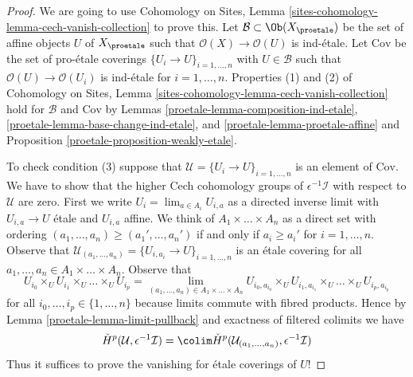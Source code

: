 \begin{proof}

We are going to use
Cohomology on Sites, Lemma \ref{sites-cohomology-lemma-cech-vanish-collection}
to prove this. Let $\mathcal{B} \subset \Ob(X_\proetale)$ be the set of affine
objects $U$ of $X_\proetale$ such that $\mathcal{O}(X) \to \mathcal{O}(U)$ is
ind-\'etale. Let $\text{Cov}$ be the set of pro-\'etale coverings
$\{U_i \to U\}_{i = 1, \ldots, n}$ with $U \in \mathcal{B}$ such that
$\mathcal{O}(U) \to \mathcal{O}(U_i)$ is ind-\'etale for $i = 1, \ldots, n$.
Properties (1) and (2) of
Cohomology on Sites, Lemma \ref{sites-cohomology-lemma-cech-vanish-collection}
hold for $\mathcal{B}$ and $\text{Cov}$ by
Lemmas \ref{proetale-lemma-composition-ind-etale},
\ref{proetale-lemma-base-change-ind-etale}, and
\ref{proetale-lemma-proetale-affine} and
Proposition \ref{proetale-proposition-weakly-etale}.

\medskip\noindent
To check condition (3) suppose that
$\mathcal{U} = \{U_i \to U\}_{i = 1, \ldots, n}$
is an element of $\text{Cov}$. We have to show that the higher
Cech cohomology groups of $\epsilon^{-1}\mathcal{I}$
with respect to $\mathcal{U}$ are zero.
First we write $U_i = \lim_{a \in A_i} U_{i, a}$ as a directed inverse limit
with $U_{i, a} \to U$ \'etale and $U_{i, a}$ affine.
We think of $A_1 \times \ldots \times A_n$ as a direct set
with ordering $(a_1, \ldots, a_n) \geq (a_1', \ldots, a_n')$
if and only if $a_i \geq a_i'$ for $i = 1, \ldots, n$.
Observe that
$\mathcal{U}_{(a_1, \ldots, a_n)} = \{U_{i, a_i} \to U\}_{i = 1, \ldots, n}$
is an \'etale covering for all
$a_1, \ldots, a_n \in A_1 \times \ldots \times A_n$.
Observe that
$$
U_{i_0} \times_U U_{i_1} \times_U \ldots \times_U U_{i_p}
=
\lim_{(a_1, \ldots, a_n) \in A_1 \times \ldots \times A_n}
U_{i_0, a_{i_0}} \times_U
U_{i_1, a_{i_1}} \times_U \ldots \times_U U_{i_p, a_{i_p}}
$$
for all $i_0, \ldots, i_p \in \{1, \ldots, n\}$ because limits
commute with fibred products. Hence by Lemma \ref{proetale-lemma-limit-pullback}
and exactness of filtered colimits we have
$$
\check{H}^p(\mathcal{U}, \epsilon^{-1}\mathcal{I}) =
\colim \check{H}^p(\mathcal{U}_{(a_1, \ldots, a_n)}, \epsilon^{-1}\mathcal{I})
$$
Thus it suffices to prove the vanishing for \'etale coverings
of $U$!


\end{proof}
